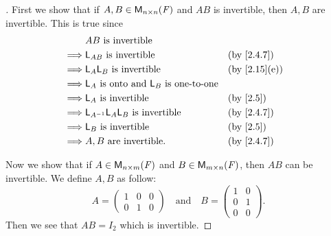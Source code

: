 \begin{proof}[]
  First we show that if \(A, B \in \mathsf{M}_{{n} \times n}({\mathit{F}})\) and \(AB\) is invertible, then \(A, B\) are invertible.
  This is true since
  \begin{align*}
             & AB \text{ is invertible}                                                             \\
    \implies & \L_{AB} \text{ is invertible}                        &  & \text{(by \cref{2.4.7})}   \\
    \implies & \L_A \L_B \text{ is invertible}                      &  & \text{(by \cref{2.15}(e))} \\
    \implies & \L_A \text{ is onto and } \L_B \text{ is one-to-one}                                 \\
    \implies & \L_A \text{ is invertible}                           &  & \text{(by \cref{2.5})}     \\
    \implies & \L_{A^{-1}} \L_A \L_B \text{ is invertible}          &  & \text{(by \cref{2.4.7})}   \\
    \implies & \L_B \text{ is invertible}                           &  & \text{(by \cref{2.5})}     \\
    \implies & A, B \text{ are invertible}.                         &  & \text{(by \cref{2.4.7})}
  \end{align*}

  Now we show that if \(A \in \mathsf{M}_{{n} \times m}({\mathit{F}})\) and \(B \in \mathsf{M}_{{m} \times n}({\mathit{F}})\), then \(AB\) can be invertible.
  We define \(A, B\) as follow:
  \[
    A = \begin{pmatrix}
      1 & 0 & 0 \\
      0 & 1 & 0
    \end{pmatrix} \quad \text{and} \quad B = \begin{pmatrix}
      1 & 0 \\
      0 & 1 \\
      0 & 0
    \end{pmatrix}.
  \]
  Then we see that \(AB = I_2\) which is invertible.
\end{proof}
